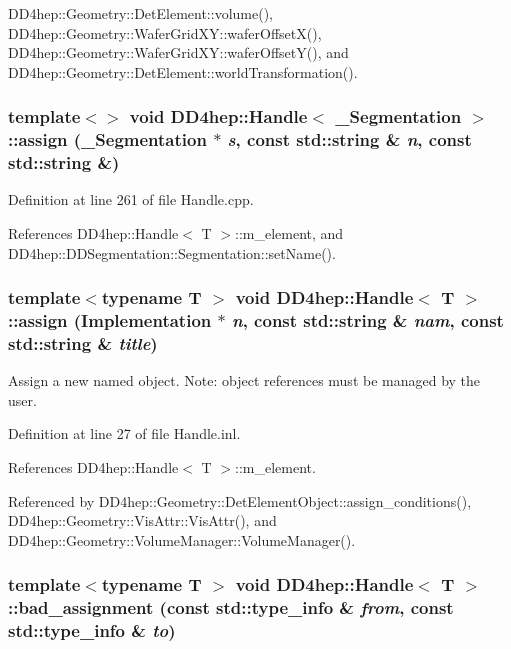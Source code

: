 DD4hep::Geometry::DetElement::volume(), DD4hep::Geometry::WaferGridXY::waferOffsetX(), DD4hep::Geometry::WaferGridXY::waferOffsetY(), and DD4hep::Geometry::DetElement::worldTransformation().\hypertarget{class_d_d4hep_1_1_handle_a021b31343bc6d67c3c1743f2e1fbc2b7}{
\subsubsection[{assign}]{\setlength{\rightskip}{0pt plus 5cm}template$<$$>$ void {\bf DD4hep::Handle}$<$ {\bf \_\-Segmentation} $>$::assign ({\bf \_\-Segmentation} $\ast$ {\em s}, \/  const std::string \& {\em n}, \/  const std::string \&)}}
\label{class_d_d4hep_1_1_handle_a021b31343bc6d67c3c1743f2e1fbc2b7}


Definition at line 261 of file Handle.cpp.

References DD4hep::Handle$<$ T $>$::m\_\-element, and DD4hep::DDSegmentation::Segmentation::setName().\hypertarget{class_d_d4hep_1_1_handle_a9f5b5d3feb89adf95fdfc4148c711209}{
\subsubsection[{assign}]{\setlength{\rightskip}{0pt plus 5cm}template$<$typename T $>$ void {\bf DD4hep::Handle}$<$ {\bf T} $>$::assign ({\bf Implementation} $\ast$ {\em n}, \/  const std::string \& {\em nam}, \/  const std::string \& {\em title})}}
\label{class_d_d4hep_1_1_handle_a9f5b5d3feb89adf95fdfc4148c711209}


Assign a new named object. Note: object references must be managed by the user. 

Definition at line 27 of file Handle.inl.

References DD4hep::Handle$<$ T $>$::m\_\-element.

Referenced by DD4hep::Geometry::DetElementObject::assign\_\-conditions(), DD4hep::Geometry::VisAttr::VisAttr(), and DD4hep::Geometry::VolumeManager::VolumeManager().\hypertarget{class_d_d4hep_1_1_handle_a7d6ad39bc68063a34d8d42ce1d9aef75}{
\subsubsection[{bad\_\-assignment}]{\setlength{\rightskip}{0pt plus 5cm}template$<$typename T $>$ void {\bf DD4hep::Handle}$<$ {\bf T} $>$::bad\_\-assignment (const std::type\_\-info \& {\em from}, \/  const std::type\_\-info \& {\em to})}}
\label{class_d_d4hep_1_1_handle_a7d6ad39bc68063a34d8d42ce1d9aef75}


